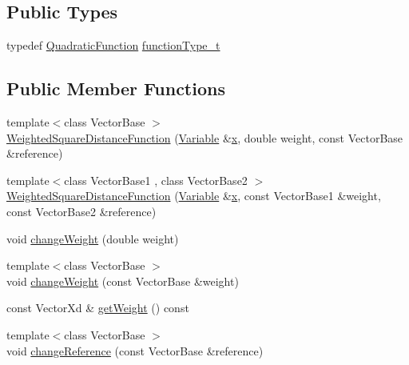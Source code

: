 \subsection*{Public Types}
\begin{DoxyCompactItemize}
\item 
typedef \hyperlink{classocra_1_1QuadraticFunction}{Quadratic\+Function} \hyperlink{classocra_1_1WeightedSquareDistanceFunction_ab8fcee2e8ec81e8790f3d00b1d541d9a}{function\+Type\+\_\+t}
\end{DoxyCompactItemize}
\subsection*{Public Member Functions}
\begin{DoxyCompactItemize}
\item 
{\footnotesize template$<$class Vector\+Base $>$ }\\\hyperlink{classocra_1_1WeightedSquareDistanceFunction_a25942322441c7bac8adb24d8f1d27905}{Weighted\+Square\+Distance\+Function} (\hyperlink{classocra_1_1Variable}{Variable} \&\hyperlink{classocra_1_1Function_a28825886d1f149c87b112ec2ec1dd486}{x}, double weight, const Vector\+Base \&reference)
\item 
{\footnotesize template$<$class Vector\+Base1 , class Vector\+Base2 $>$ }\\\hyperlink{classocra_1_1WeightedSquareDistanceFunction_a1aca7da80ddc408d8194d32712418b89}{Weighted\+Square\+Distance\+Function} (\hyperlink{classocra_1_1Variable}{Variable} \&\hyperlink{classocra_1_1Function_a28825886d1f149c87b112ec2ec1dd486}{x}, const Vector\+Base1 \&weight, const Vector\+Base2 \&reference)
\item 
void \hyperlink{classocra_1_1WeightedSquareDistanceFunction_aa46e440abf19590ebdc4b72b97c9901d}{change\+Weight} (double weight)
\item 
{\footnotesize template$<$class Vector\+Base $>$ }\\void \hyperlink{classocra_1_1WeightedSquareDistanceFunction_a8001ac136e0c486571e5523d01e6de38}{change\+Weight} (const Vector\+Base \&weight)
\item 
const Vector\+Xd \& \hyperlink{classocra_1_1WeightedSquareDistanceFunction_a3736eb1be0e3c78ab466b2984d9c82a0}{get\+Weight} () const 
\item 
{\footnotesize template$<$class Vector\+Base $>$ }\\void \hyperlink{classocra_1_1WeightedSquareDistanceFunction_a6a81acd002eb8f7576b0c9ee99e1bc46}{change\+Reference} (const Vector\+Base \&reference)
\end{DoxyCompactItemize}
